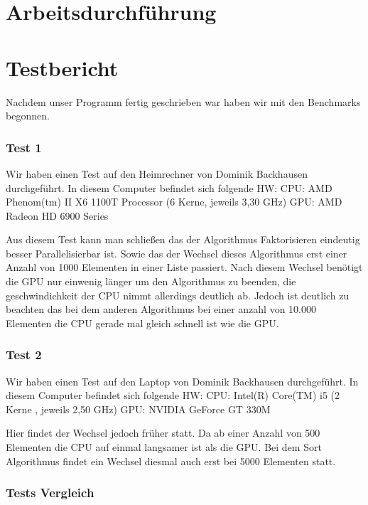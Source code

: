 \documentclass[a4paper,12pt]{scrreprt}
\begin{document}
\chapter{Arbeitsdurchführung}
	
\chapter{Testbericht}
Nachdem unser Programm fertig geschrieben war haben wir mit den Benchmarks begonnen.

\subsection{Test 1}
Wir haben einen Test auf den Heimrechner von Dominik Backhausen durchgeführt.\newline
In diesem Computer befindet sich folgende HW:\newline
CPU: AMD Phenom(tm) II X6 1100T Processor (6 Kerne, jeweils 3,30 GHz)
GPU: AMD Radeon HD 6900 Series


Aus diesem Test kann man schließen das der Algorithmus Faktorisieren eindeutig besser Parallelisierbar ist.
Sowie das der Wechsel dieses Algorithmus erst einer Anzahl von 1000 Elementen in einer Liste passiert.
Nach diesem Wechsel benötigt die GPU nur einwenig länger um den Algorithmus zu beenden, die geschwindichkeit der CPU nimmt allerdings deutlich ab.\newline
Jedoch ist deutlich zu beachten das bei dem anderen Algorithmus bei einer anzahl von 10.000 Elementen die CPU gerade mal gleich schnell ist wie die GPU.

\subsection{Test 2}
Wir haben einen Test auf den Laptop von Dominik Backhausen durchgeführt.\newline
In diesem Computer befindet sich folgende HW:\newline
CPU: Intel(R) Core(TM) i5 (2 Kerne , jeweils 2,50 GHz)
GPU: NVIDIA GeForce GT 330M


Hier findet der Wechsel jedoch früher statt. Da ab einer Anzahl von 500 Elementen die CPU auf einmal langsamer ist als die GPU.
Bei dem Sort Algorithmus findet ein Wechsel diesmal auch erst bei 5000 Elementen statt.

\subsection{Tests Vergleich}
\end{document}
